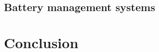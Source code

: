 \documentclass[12pt]{article} %
\begin{document}
\subsection{Battery management systems}









\section{Conclusion} %

\lipsum[12-13]





\end{document}
